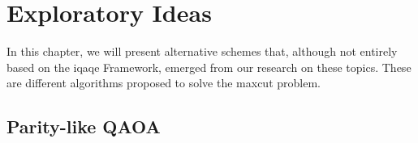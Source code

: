 
\chapter{Exploratory Ideas}
\label{chapter:Exploratory_Ideas}

In this chapter, we will present alternative schemes that, although not entirely based on the \acrshort{iqaqe} Framework, emerged from our research on these topics. These are different algorithms proposed to solve the \acrshort{maxcut} problem.

\section{Parity-like QAOA}
\label{section:Parity_QAOA}

